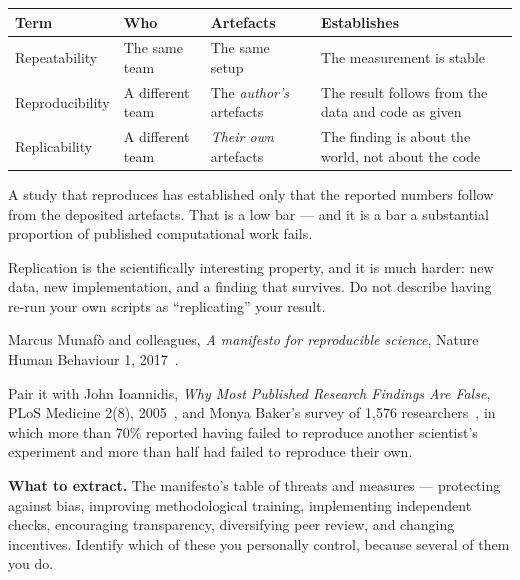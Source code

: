 \begin{center}
\small
\begin{tabular}{@{}L{3.0cm}L{3.6cm}L{3.4cm}L{3.4cm}@{}}
\toprule
\textbf{Term} & \textbf{Who} & \textbf{Artefacts} & \textbf{Establishes} \\
\midrule
Repeatability   & The same team & The same setup & The measurement is stable \\
Reproducibility & A different team & The \emph{author's} artefacts &
                  The result follows from the data and code as given \\
Replicability   & A different team & \emph{Their own} artefacts &
                  The finding is about the world, not about the code \\
\bottomrule
\end{tabular}
\end{center}

\begin{conceptbox}
A study that reproduces has established only that the reported numbers follow
from the deposited artefacts. That is a low bar --- and it is a bar a
substantial proportion of published computational work fails.

\medskip
Replication is the scientifically interesting property, and it is much harder:
new data, new implementation, and a finding that survives. Do not describe
having re-run your own scripts as ``replicating'' your result.
\end{conceptbox}

\begin{paperbox}
Marcus Munaf\`o and colleagues, \emph{A manifesto for reproducible science},
Nature Human Behaviour 1, 2017~\cite{munafo2017manifesto}.\oa{}

\medskip
Pair it with John Ioannidis, \emph{Why Most Published Research Findings Are
False}, PLoS Medicine 2(8), 2005~\cite{ioannidis2005why}\oa{}, and Monya Baker's
survey of 1,576 researchers~\cite{baker2016reproducibility}, in which more than
70\% reported having failed to reproduce another scientist's experiment and
more than half had failed to reproduce their own.

\medskip
\textbf{What to extract.} The manifesto's table of threats and measures ---
protecting against bias, improving methodological training, implementing
independent checks, encouraging transparency, diversifying peer review, and
changing incentives. Identify which of these you personally control, because
several of them you do.
\end{paperbox}

